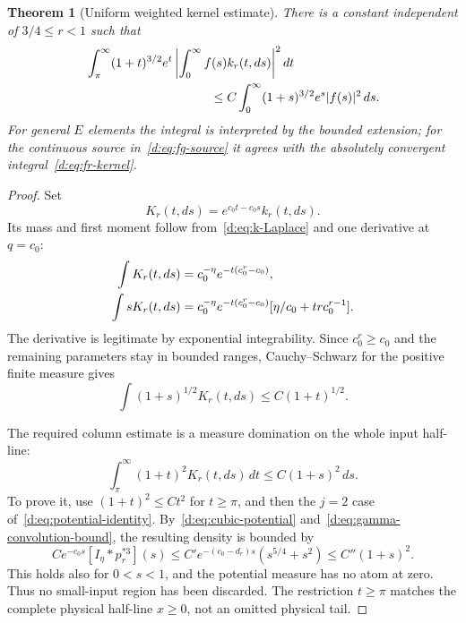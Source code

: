 \documentclass[11pt,a4paper]{article}
\numberwithin{equation}{section}
\newtheorem{theorem}{Theorem}[section]
\theoremstyle{definition}\newtheorem{definition}[theorem]{Definition}
\theoremstyle{remark}\newtheorem{remark}[theorem]{Remark}
\begin{document}
\begin{theorem}[Uniform weighted kernel estimate]\label{d:thm:weighted-kernel}
There is a constant independent of $3/4\le r<1$ such that
\begin{align}
 &\int_\pi^\infty(1+t)^{3/2}e^t
       \left|\int_0^\infty f(s)k_r(t,ds)\right|^2dt\notag\\
 &\hspace{35mm}\le C\int_0^\infty(1+s)^{3/2}e^s|f(s)|^2\,ds.
 \label{d:eq:uniform-kernel}
\end{align}
For general $E$ elements the integral is interpreted by the bounded extension; for the continuous source in~\eqref{d:eq:fg-source} it agrees with the absolutely convergent integral~\eqref{d:eq:fr-kernel}.
\end{theorem}
\begin{proof}
Set
\[
 K_r(t,ds)=e^{c_0t-c_0s}k_r(t,ds).
\]
Its mass and first moment follow from~\eqref{d:eq:k-Laplace} and one derivative at $q=c_0$:
\begin{align}
 \int K_r(t,ds)&=c_0^{-\eta}e^{-t(c_0^r-c_0)},\notag\\
 \int sK_r(t,ds)&=
 c_0^{-\eta}e^{-t(c_0^r-c_0)}
        [\eta/c_0+trc_0^{r-1}].
 \label{d:eq:kernel-moments}
\end{align}
The derivative is legitimate by exponential integrability. Since $c_0^r\ge c_0$ and the remaining parameters stay in bounded ranges, Cauchy--Schwarz for the positive finite measure gives
\begin{equation}\label{d:eq:Schur-row}
 \int(1+s)^{1/2}K_r(t,ds)\le C(1+t)^{1/2}.
\end{equation}

The required column estimate is a measure domination on the whole input half-line:
\begin{equation}\label{d:eq:Schur-column}
 \int_\pi^\infty(1+t)^2K_r(t,ds)\,dt
 \le C(1+s)^2\,ds.
\end{equation}
To prove it, use $(1+t)^2\le Ct^2$ for $t\ge\pi$, and then the $j=2$ case of~\eqref{d:eq:potential-identity}. By~\eqref{d:eq:cubic-potential} and~\eqref{d:eq:gamma-convolution-bound}, the resulting density is bounded by
\[
 C e^{-c_0s}[I_\eta*p_r^{*3}](s)
 \le C'e^{-(c_0-d_r)s}(s^{5/4}+s^2)
 \le C''(1+s)^2.
\]
This holds also for $0<s<1$, and the potential measure has no atom at zero. Thus no small-input region has been discarded. The restriction $t\ge\pi$ matches the complete physical half-line $x\ge0$, not an omitted physical tail.


\end{proof}
\end{document}
